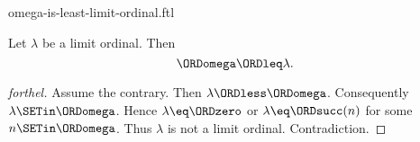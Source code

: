 \documentclass{stex}
\begin{document}
\begin{smodule}{omega-is-least-limit-ordinal.ftl}

\begin{proposition}[forthel,id=SET_THEORY_03_5517271459954688]
  Let $\lambda$ be a limit ordinal.
  Then \[ \ORDomega \ORDleq \lambda. \]
\end{proposition}
\begin{proof}[forthel]
  Assume the contrary.
  Then $\lambda \ORDless \ORDomega$.
  Consequently $\lambda \SETin \ORDomega$.
  Hence $\lambda \eq \ORDzero$ or $\lambda \eq \ORDsucc(n)$ for some $n \SETin \ORDomega$.
  Thus $\lambda$ is not a limit ordinal.
  Contradiction.
\end{proof}
\end{smodule}
\end{document}

